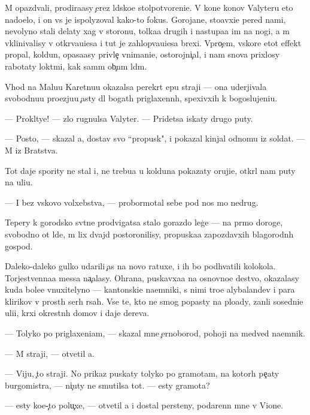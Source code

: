 \documentclass[10pt]{book}
\begin{document}
M{\yi} opazd{\yi}vali, prodira{\y}asy {\c}erez l{\iu}dsko{\y}e stolpotvoreni{\y}e. V kon{\q}e kon{\q}ov Valyteru eto nado{\y}elo, i on vs{\e} je ispolyzoval kako{\y}-to fokus. Gorojane, sto{\y}avxi{\y}e pered nami, nevolyno stali delaty xag v storonu, tolka{\y}a drugih i nastupa{\y}a im na nogi, a m{\yi} vklinivalisy v otkr{\yi}va{\y}u{\x}i{\y}esa i tut je zahlop{\yi}va{\y}u{\x}i{\y}esa brexi. Vpro{\c}em, vskore etot effekt propal, koldun, opasa{\y}asy privle{\c} vnimani{\y}e, ostorojni{\c}al, i nam snova prixlosy rabotaty lokt{\ia}mi, kak sam{\yi}m ob{\yi}{\c}n{\yi}m l{\iu}d{\ia}m.

V{\yi}hod na Malu{\y}u Karetnu{\y}u okazalsa perekr{\yi}t {\q}ep{\y}u straji — ona uderjivala svobodnu{\y}u pro{\y}ezju{\y}u {\c}asty dl{\ia} bogat{\yi}h priglaxenn{\yi}h, spexivxih k bogoslujeni{\y}u.

— Prokl{\ia}tye! — zlo rugnulsa Valyter. — Pridetsa iskaty drugo{\y} puty.

— Posto{\y}, — skazal {\y}a, dostav svo{\y} ``propusk", i pokazal kinjal odnomu iz soldat. — M{\yi} iz Bratstva.

Tot daje spority ne stal i, ne trebu{\y}a u kolduna pokazaty oruji{\y}e, otkr{\yi}l nam puty na uli{\q}u.

— I bez vs{\ia}kovo volxebstva, — probormotal sebe pod nos mo{\y} nedrug.

Tepery k gorodsko{\y} sv{\ia}t{\yi}ne prodvigatsa stalo gorazdo leg{\c}e — na pr{\ia}mo{\y} doroge, svobodno{\y} ot l{\iu}de{\y}, m{\yi} lix dvajd{\yi} postoronilisy, propuska{\y}a zapozdavxih blagorodn{\yi}h gospod.

Daleko-daleko gulko udarili {\c}as{\yi} na novo{\y} ratuxe, i ih bo{\y} podhvatili kolokola. Torjestvenna{\y}a messa na{\c}alasy. Ohrana, puskavxa{\y}a na osnovno{\y}e de{\y}stvo, okazalasy kuda bole{\y}e vnuxitelyno{\y} — kantonski{\y}e na{\y}emniki, s nimi tro{\y}e alybaland{\q}ev i para klirikov v prost{\yi}h ser{\yi}h r{\ia}sah. Vse te, kto ne smog popasty na plo{\x}ady, zan{\ia}li sosedni{\y}e uli{\q}i, kr{\yi}xi okrestn{\yi}h domov i daje derev{\y}a.

— Tolyko po priglaxeni{\y}am, — skazal mne {\c}ernoborod{\yi}{\y}, pohoji{\y} na medved{\ia} na{\y}emnik.

— M{\yi} straji, — otvetil {\y}a.

— Viju, {\c}to straji. No prikaz puskaty tolyko po gramotam, na kotor{\yi}h pe{\c}aty burgomistra, — ni{\c}uty ne smutilsa tot. — {\Y}esty gramota?

— {\Y}esty ko{\y}e-{\c}to polu{\c}xe, — otvetil {\y}a i dostal persteny, podarenn{\yi}{\y} mne v Vione.
\end{document}
